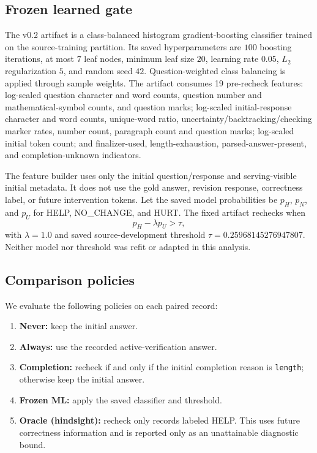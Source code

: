 \documentclass[conference]{IEEEtran}
\begin{document}
\subsection{Frozen learned gate}
The v0.2 artifact is a class-balanced histogram gradient-boosting classifier trained on the source-training partition. Its saved hyperparameters are $100$ boosting iterations, at most $7$ leaf nodes, minimum leaf size $20$, learning rate $0.05$, $L_2$ regularization $5$, and random seed $42$. Question-weighted class balancing is applied through sample weights. The artifact consumes 19 pre-recheck features: log-scaled question character and word counts, question number and mathematical-symbol counts, and question marks; log-scaled initial-response character and word counts, unique-word ratio, uncertainty/backtracking/checking marker rates, number count, paragraph count and question marks; log-scaled initial token count; and finalizer-used, length-exhaustion, parsed-answer-present, and completion-unknown indicators.

The feature builder uses only the initial question/response and serving-visible initial metadata. It does not use the gold answer, revision response, correctness label, or future intervention tokens. Let the saved model probabilities be $p_H$, $p_N$, and $p_U$ for HELP, NO\_CHANGE, and HURT. The fixed artifact rechecks when
\begin{equation}
  p_H - \lambda p_U > \tau,
\end{equation}
with $\lambda=1.0$ and saved source-development threshold $\tau=0.25968145276947807$. Neither model nor threshold was refit or adapted in this analysis.

\subsection{Comparison policies}
We evaluate the following policies on each paired record:
\begin{enumerate}
  \item \textbf{Never:} keep the initial answer.
  \item \textbf{Always:} use the recorded active-verification answer.
  \item \textbf{Completion:} recheck if and only if the initial completion reason is \texttt{length}; otherwise keep the initial answer.
  \item \textbf{Frozen ML:} apply the saved classifier and threshold.
  \item \textbf{Oracle (hindsight):} recheck only records labeled HELP. This uses future correctness information and is reported only as an unattainable diagnostic bound.
\end{enumerate}
\end{document}
